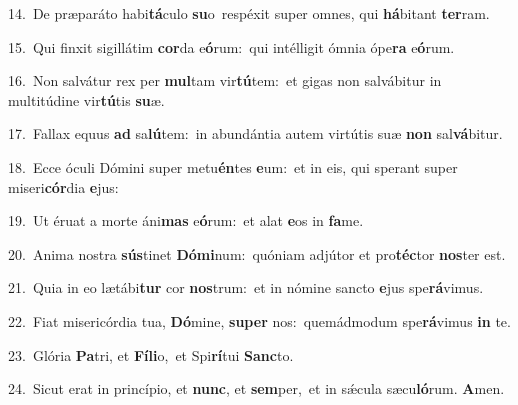 {\numbfont\textcolor{\numbcolor}{14.}}~De præparáto habi\-\textbf{tá}\-culo \textbf{su}\-o~\star respéxit super omnes, qui \textbf{há}\-bitant \textbf{ter}\-ram.\par
{\numbfont\textcolor{\numbcolor}{15.}}~Qui finxit sigillátim \textbf{cor}\-da e\-\textbf{ó}\-rum:~\star qui intélligit ómnia ópe\textbf{ra} e\-\textbf{ó}\-rum.\par
{\numbfont\textcolor{\numbcolor}{16.}}~Non salvátur rex per \textbf{mul}\-tam vir\-\textbf{tú}\-tem:~\star et gigas non salvábitur in multitúdine vir\-\textbf{tú}\-tis \textbf{su}\-æ.\par
{\numbfont\textcolor{\numbcolor}{17.}}~Fallax equus \textbf{ad} sa\-\textbf{lú}\-tem:~\star in abundántia autem virtútis suæ \textbf{non} sal\-\textbf{vá}\-bitur.\par
{\numbfont\textcolor{\numbcolor}{18.}}~Ecce óculi Dómini super metu\-\textbf{én}\-tes \textbf{e}\-um:~\star et in eis, qui sperant super miseri\-\textbf{cór}\-dia \textbf{e}\-jus:\par
{\numbfont\textcolor{\numbcolor}{19.}}~Ut éruat a morte áni\textbf{mas} e\-\textbf{ó}\-rum:~\star et alat \textbf{e}\-os in \textbf{fa}\-me.\par
{\numbfont\textcolor{\numbcolor}{20.}}~Anima nostra \textbf{sús}\-tinet \textbf{Dó}\-\textbf{mi}num:~\star quóniam adjútor et pro\-\textbf{téc}\-tor \textbf{nos}\-ter est.\par
{\numbfont\textcolor{\numbcolor}{21.}}~Quia in eo lætábi\textbf{tur} cor \textbf{nos}\-trum:~\star et in nómine sancto \textbf{e}\-jus spe\-\textbf{rá}\-vimus.\par
{\numbfont\textcolor{\numbcolor}{22.}}~Fiat misericórdia tua, \textbf{Dó}\-mine, \textbf{su}\-\textbf{per} nos:~\star quemádmodum spe\-\textbf{rá}\-vimus \textbf{in} te.\par
{\numbfont\textcolor{\numbcolor}{23.}}~Glória \textbf{Pa}\-tri, et \textbf{Fí}\-\textbf{li}o,~\star et Spi\-\textbf{rí}\-tui \textbf{Sanc}\-to.\par
{\numbfont\textcolor{\numbcolor}{24.}}~Sicut erat in princípio, et \textbf{nunc}\-, et \textbf{sem}\-per,~\star et in sǽcula sæcu\-\textbf{ló}\-rum. \textbf{A}\-men.\par
